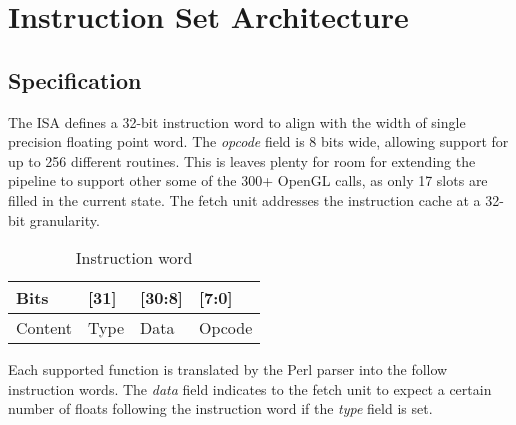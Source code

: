 \documentclass[letterpaper,10pt]{article}
\begin{document}
\section{Instruction Set Architecture}

\subsection{Specification}

The ISA defines a 32-bit instruction word to align with the width of single precision floating point word. The \emph{opcode} field is 8 bits wide, allowing support for up to 256 different routines. This is leaves plenty for room for extending the pipeline to support other some of the 300+ OpenGL calls, as only 17 slots are filled in the current state. The fetch unit addresses the instruction cache at a 32-bit granularity.

\begin{table}[h]
\begin{center}
\begin{tabular}{ | l | l | l | l |}
\hline
Bits & [31] & [30:8] & [7:0] \\ \hline
Content & Type & Data & Opcode \\ \hline
\end{tabular}
\end{center}
\caption{Instruction word}
\end{table}

Each supported function is translated by the Perl parser into the follow instruction words. The \emph{data} field indicates to the fetch unit to expect a certain number of floats following the instruction word if the \emph{type} field is set.
\end{document}
